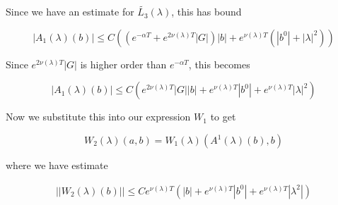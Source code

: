 \documentclass[12pt]{article}
\begin{document}
\begin{enumerate}
Since we have an estimate for $\tilde{L_3}(\lambda)$, this has bound

\[
|A_1(\lambda)(b)| \leq C ( (e^{-\alpha T}+ e^{2\nu(\lambda)T}|G|)|b| + e^{\nu(\lambda)T}( |b^0| + |\lambda|^2))
\]

Since $e^{2\nu(\lambda)T}|G|$ is higher order than $e^{-\alpha T}$, this becomes

\[
|A_1(\lambda)(b)| \leq C ( e^{2\nu(\lambda)T}|G| |b| + e^{\nu(\lambda)T} |b^0| + e^{\nu(\lambda)T} |\lambda|^2)
\]

Now we substitute this into our expression $W_1$ to get 

\[
W_2(\lambda)(a,b) = W_1(\lambda)(A^1(\lambda)(b),b)
\]

where we have estimate

\begin{align*}
||W_2(\lambda)(b)|| \leq C e^{\nu(\lambda)T} (|b| + e^{\nu(\lambda)T} |b^0| + e^{\nu(\lambda)T} |\lambda^2| )
\end{align*}



\end{enumerate}
\end{document}
